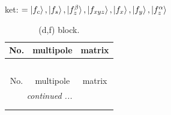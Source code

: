 \documentclass[fleqn,8pt,landscape]{jsarticle}
\begin{document}
\noindent
ket: $=\ket{f_{c}}, \ket{f_{s}}, \ket{f_{z}^{\beta}}, \ket{f_{xyz}}, \ket{f_{x}}, \ket{f_{y}}, \ket{f_{z}^{\alpha}}$
\renewcommand{\arraystretch}{1.6}
\begin{longtable}{ccc}
\caption{(d,f) block.}
 \\
 \hline \hline
No. & multipole & matrix \\ \hline \endfirsthead

\multicolumn{2}{l}{\tablename\ \thetable{}} \\
 \hline \hline
No. & multipole & matrix \\ \hline \endhead

 \hline \hline
\multicolumn{2}{r}{\footnotesize\it continued ...} \\ \endfoot

 \hline \hline
\multicolumn{2}{r}{} \\ \endlastfoot


\end{longtable}
\end{document}
